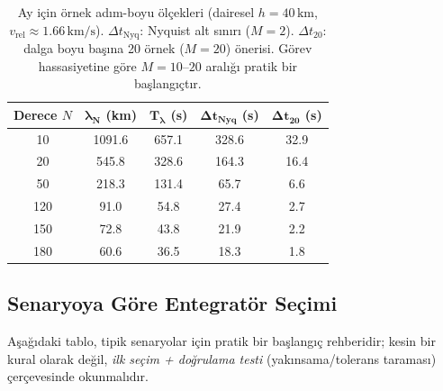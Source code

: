 \begin{table}[h]
\centering
\small
\renewcommand{\arraystretch}{1.15}
\begin{tabular}{c c c c c}
\hline
\textbf{Derece \(N\)} &
\(\boldsymbol{\lambda_N}\) \textbf{(km)} &
\(\boldsymbol{T_{\lambda}}\) \textbf{(s)} &
\(\boldsymbol{\Delta t_{\text{Nyq}}}\) \textbf{(s)} &
\(\boldsymbol{\Delta t_{20}}\) \textbf{(s)} \\ \hline
10  & 1091.6 & 657.1 & 328.6 & 32.9 \\
20  & 545.8  & 328.6 & 164.3 & 16.4 \\
50  & 218.3  & 131.4 & 65.7  & 6.6 \\
120 & 91.0   & 54.8  & 27.4  & 2.7 \\
150 & 72.8   & 43.8  & 21.9  & 2.2 \\
180 & 60.6   & 36.5  & 18.3  & 1.8 \\
\hline
\end{tabular}
\caption{Ay için örnek adım-boyu ölçekleri (dairesel \(h=40\,\mathrm{km}\), \(v_{\text{rel}}\approx 1.66\,\mathrm{km/s}\)).
\(\Delta t_{\text{Nyq}}\): Nyquist alt sınırı (\(M=2\)). \(\Delta t_{20}\): dalga boyu başına 20 örnek (\(M=20\)) önerisi.
Görev hassasiyetine göre \(M=10\text{--}20\) aralığı pratik bir başlangıçtır.}
\label{tab:nyquist_moon_steps}
\end{table}


\newpage
\subsection{Senaryoya Göre Entegratör Seçimi}
Aşağıdaki tablo, tipik senaryolar için pratik bir başlangıç rehberidir; kesin bir kural olarak değil,
\emph{ilk seçim + doğrulama testi} (yakınsama/tolerans taraması) çerçevesinde okunmalıdır.

